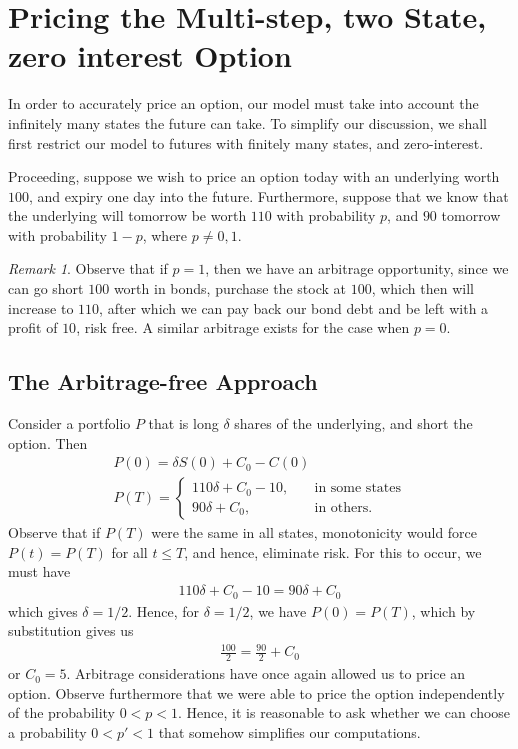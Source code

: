 \documentclass[12pt]{article}
\theoremstyle{plain}
\theoremstyle{definition}
\theoremstyle{remark}
\newtheorem*{remark}{Remark}
\numberwithin{equation}{section}  %
\begin{document}
\section{Pricing the Multi-step, two State, zero interest Option}
In order to accurately price an option, our model must take into account the
infinitely many states the future can take. To simplify our discussion, we shall
first restrict our model to futures with finitely many states, and
zero-interest. 

Proceeding, suppose we wish to price an option today with an underlying worth
$100$, and expiry one day into the future. Furthermore, suppose that we know
that the underlying will tomorrow be worth $110$ with probability $p$, and $90$
tomorrow with probability $1-p$, where $p \neq 0,1$. 
\begin{remark}
	Observe that if $p=1$, then we have an arbitrage opportunity, since
	we can go short $100$ worth in bonds, purchase the stock at $100$, which then will increase to $110$, after which we can pay back our bond debt and be left with 
	a profit of $10$, risk free. A similar arbitrage exists for the case when $p=0$.
\end{remark}
\subsection{The Arbitrage-free Approach}
Consider a portfolio $P$
that is long $\delta$ shares of the underlying, and short the option.
Then
\begin{gather*}
	P(0)  = \delta S(0) + C_{0} - C(0)
	\\
	P(T)  = \begin{cases}
		110 \delta + C_{0} - 10, \quad & \text{in some states}
		\\
		90 \delta + C_{0}, \quad & \text{in others}.
	\end{cases}
\end{gather*}
Observe that if $P(T)$ were the same in all states, monotonicity would force
$P(t) = P(T)$ for all $t \le T$, and hence, eliminate risk. For this to occur,
we must have
\begin{equation*}
	\begin{split}
		110 \delta + C_{0} - 10 = 90 \delta + C_{0}
	\end{split}
\end{equation*}
which gives $\delta = 1/2$. Hence, for $\delta = 1/2$, we have
$P(0) = P(T)$, which by substitution gives us
\begin{equation*}
	\begin{split}
		\frac{100}{2} = \frac{90}{2} + C_{0}
	\end{split}
\end{equation*}
or $C_{0} = 5$. Arbitrage considerations have once again
allowed us to price an option. Observe furthermore that we were able
to price the option independently of the probability $0 < p < 1$. 
Hence, it is reasonable to ask whether we can choose a probability
$0 < p' < 1$ that somehow simplifies our computations.
\end{document}
